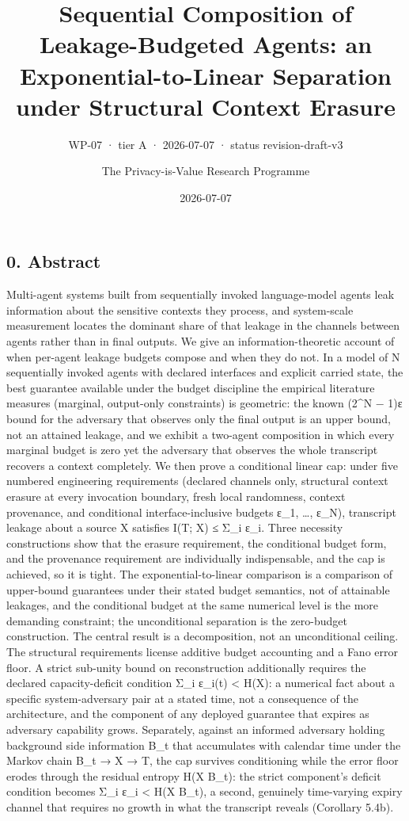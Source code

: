 \documentclass[
  11pt,
]{article}
\title{Sequential Composition of Leakage-Budgeted Agents: an
Exponential-to-Linear Separation under Structural Context Erasure}
\subtitle{WP-07 · tier A · 2026-07-07 · status revision-draft-v3}
\author{The Privacy-is-Value Research Programme}
\date{2026-07-07}
\begin{document}
\maketitle

\subsection{0. Abstract}\label{abstract}

Multi-agent systems built from sequentially invoked language-model
agents leak information about the sensitive contexts they process, and
system-scale measurement locates the dominant share of that leakage in
the channels between agents rather than in final outputs. We give an
information-theoretic account of when per-agent leakage budgets compose
and when they do not. In a model of N sequentially invoked agents with
declared interfaces and explicit carried state, the best guarantee
available under the budget discipline the empirical literature measures
(marginal, output-only constraints) is geometric: the known (2\^{}N −
1)ε bound for the adversary that observes only the final output is an
upper bound, not an attained leakage, and we exhibit a two-agent
composition in which every marginal budget is zero yet the adversary
that observes the whole transcript recovers a context completely. We
then prove a conditional linear cap: under five numbered engineering
requirements (declared channels only, structural context erasure at
every invocation boundary, fresh local randomness, context provenance,
and conditional interface-inclusive budgets ε\_1, \ldots, ε\_N),
transcript leakage about a source X satisfies I(T; X) ≤ Σ\_i ε\_i. Three
necessity constructions show that the erasure requirement, the
conditional budget form, and the provenance requirement are individually
indispensable, and the cap is achieved, so it is tight. The
exponential-to-linear comparison is a comparison of upper-bound
guarantees under their stated budget semantics, not of attainable
leakages, and the conditional budget at the same numerical level is the
more demanding constraint; the unconditional separation is the
zero-budget construction. The central result is a decomposition, not an
unconditional ceiling. The structural requirements license additive
budget accounting and a Fano error floor. A strict sub-unity bound on
reconstruction additionally requires the declared capacity-deficit
condition Σ\_i ε\_i(t) \textless{} H(X): a numerical fact about a
specific system-adversary pair at a stated time, not a consequence of
the architecture, and the component of any deployed guarantee that
expires as adversary capability grows. Separately, against an informed
adversary holding background side information B\_t that accumulates with
calendar time under the Markov chain B\_t → X → T, the cap survives
conditioning while the error floor erodes through the residual entropy
H(X \textbar{} B\_t): the strict component's deficit condition becomes
Σ\_i ε\_i \textless{} H(X \textbar{} B\_t), a second, genuinely
time-varying expiry channel that requires no growth in what the
transcript reveals (Corollary 5.4b).
\end{document}
